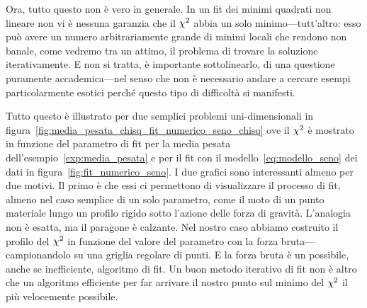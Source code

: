 Ora, tutto questo non è vero in generale. In un fit dei minimi quadrati
non lineare non vi è nessuna garanzia che il $\chi^2$ abbia un solo
minimo---tutt'altro: esso può avere un numero arbitrariamente grande di minimi
locali che rendono non banale, come vedremo tra un attimo, il problema di
trovare la soluzione iterativamente. E non si tratta, è importante
sottolinearlo, di una questione puramente accademica---nel senso che non è
necessario andare a cercare esempi  particolarmente esotici
perché questo tipo di difficoltà si manifesti.


Tutto questo è illustrato per due semplici problemi uni-dimensionali in
figura~\ref{fig:media_pesata_chisq_fit_numerico_seno_chisq} ove il $\chi^2$ è
mostrato in funzione del parametro di fit per la media pesata
dell'esempio~\ref{exp:media_pesata} e per il fit con il
modello~\eqref{eq:modello_seno} dei dati in figura~\ref{fig:fit_numerico_seno}.
I due grafici sono interessanti almeno per due motivi. Il primo è che essi ci
permettono di visualizzare il processo di fit, almeno nel caso semplice di un
solo parametro, come il moto di un punto materiale lungo un profilo rigido sotto
l'azione delle forza di gravità. L'analogia non è esatta, ma il paragone è
calzante. Nel nostro caso abbiamo costruito il profilo del $\chi^2$ in funzione
del valore del parametro con la forza bruta---campionandolo su una griglia
regolare di punti. E la forza bruta è un possibile, anche se inefficiente,
algoritmo di fit. Un buon metodo iterativo di fit non è altro che un
algoritmo efficiente per far arrivare il nostro punto sul minimo del $\chi^2$
il più velocemente possibile.

